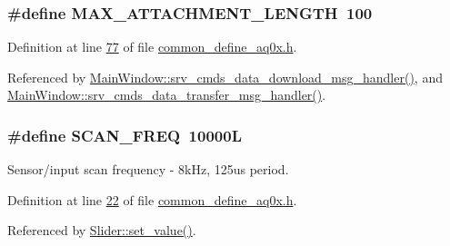 \hypertarget{a00086_aa8abe3a822c64813f7aaba3ca7e3db9c}{
\subsubsection[{M\+A\+X\+\_\+\+A\+T\+T\+A\+C\+H\+M\+E\+N\+T\+\_\+\+L\+E\+N\+G\+T\+H}]{\setlength{\rightskip}{0pt plus 5cm}\#define M\+A\+X\+\_\+\+A\+T\+T\+A\+C\+H\+M\+E\+N\+T\+\_\+\+L\+E\+N\+G\+T\+H~100}}\label{a00086_aa8abe3a822c64813f7aaba3ca7e3db9c}


Definition at line \hyperlink{a00086_source_l00077}{77} of file \hyperlink{a00086_source}{common\+\_\+define\+\_\+aq0x.\+h}.



Referenced by \hyperlink{a00136_source_l00588}{Main\+Window\+::srv\+\_\+cmds\+\_\+data\+\_\+download\+\_\+msg\+\_\+handler()}, and \hyperlink{a00136_source_l00437}{Main\+Window\+::srv\+\_\+cmds\+\_\+data\+\_\+transfer\+\_\+msg\+\_\+handler()}.

\hypertarget{a00086_a8127170b687c1f67a968886c128e76e4}{
\subsubsection[{S\+C\+A\+N\+\_\+\+F\+R\+E\+Q}]{\setlength{\rightskip}{0pt plus 5cm}\#define S\+C\+A\+N\+\_\+\+F\+R\+E\+Q~10000\+L}}\label{a00086_a8127170b687c1f67a968886c128e76e4}


Sensor/input scan frequency -\/ 8k\+Hz, 125us period. 



Definition at line \hyperlink{a00086_source_l00022}{22} of file \hyperlink{a00086_source}{common\+\_\+define\+\_\+aq0x.\+h}.



Referenced by \hyperlink{a00133_source_l00102}{Slider\+::set\+\_\+value()}.

